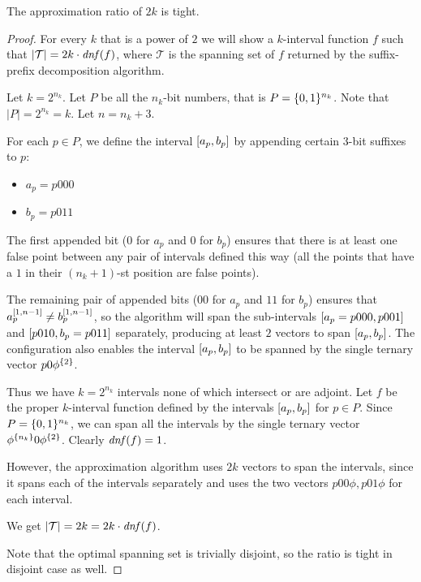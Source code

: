 \begin{theorem}
\label{theorem:2kapproxtight}
The approximation ratio of $2k$ is tight.
\end{theorem}

\begin{proof}
For every $k$ that is a power of $2$
we will show a $k$-interval function $f$ such that
$|\mathcal{T}| = 2k \cdot \mathit{dnf} (f)$,
where $\mathcal{T}$ is the spanning set of $f$
returned by the suffix-prefix decomposition algorithm.

Let $k = 2^{n_k}$.
Let $P$ be all the $n_k$-bit numbers,
that is $P = \{0, 1\}^{n_k}$.
Note that $|P| = 2^{n_k} = k$.
Let $n = n_k + 3$.

For each $p \in P$,
we define the interval $[a_p, b_p]$
by appending certain $3$-bit suffixes to $p$:

\begin{itemize}
\item $a_p = p 000$
\item $b_p = p 011$
\end{itemize}

The first appended bit
($0$ for $a_p$ and $0$ for $b_p$)
ensures that there is at least one false point
between any pair of intervals defined this way
(all the points that have a $1$ in their $(n_k + 1)$-st
position are false points).

The remaining pair of appended bits
($00$ for $a_p$ and $11$ for $b_p$)
ensures that
$a_p^{[1, n-1]} \neq b_p^{[1, n-1]}$,
so the algorithm will span the sub-intervals
$[a_p = p 000, p 001]$
and $[p 010, b_p = p 011]$ separately,
producing at least $2$ vectors to span
$[a_p, b_p]$.
The configuration also enables
the interval $[a_p, b_p]$
to be spanned by the single ternary vector
$p 0 \phi^{\{2\}}$.

Thus we have $k = 2^{n_k}$ intervals
none of which intersect or are adjoint.
Let $f$ be the proper $k$-interval function
defined by the intervals
$[a_p, b_p]$ for $p \in P$.
Since $P = \{0, 1\}^{n_k}$,
we can span all the intervals by the single ternary vector
$\phi^{\{n_k\}} 0 \phi^{\{2\}}$.
Clearly $\mathit{dnf} (f) = 1$.

However,
the approximation algorithm uses $2k$ vectors to span
the intervals,
since it spans each of the intervals separately
and uses the two vectors
$p 0 0 \phi, p 0 1 \phi$
for each interval.

We get
$|\mathcal{T}| = 2k = 2k \cdot \mathit{dnf} (f)$.

Note that the optimal spanning set is trivially disjoint,
so the ratio is tight in disjoint case as well.
\end{proof}
